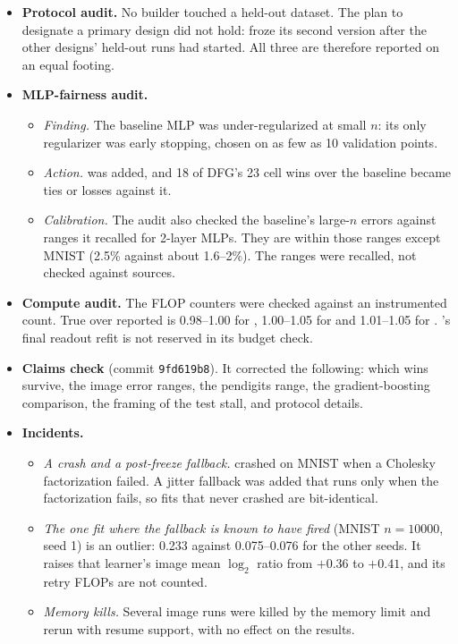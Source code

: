 \begin{itemize}
\item \textbf{Protocol audit.} No builder touched a held-out dataset. The plan to designate a primary design did not hold:  froze its second version after the other designs' held-out runs had started. All three are therefore reported on an equal footing.
\item \textbf{MLP-fairness audit.}
  \begin{itemize}
  \item \emph{Finding.} The baseline MLP was under-regularized at small $n$: its only regularizer was early stopping, chosen on as few as 10 validation points.
  \item \emph{Action.}  was added, and 18 of DFG's 23 cell wins over the baseline became ties or losses against it.
  \item \emph{Calibration.} The audit also checked the baseline's large-$n$ errors against ranges it recalled for 2-layer MLPs. They are within those ranges except MNIST (2.5\% against about 1.6--2\%). The ranges were recalled, not checked against sources.
  \end{itemize}
\item \textbf{Compute audit.} The FLOP counters were checked against an instrumented count. True over reported is 0.98--1.00 for , 1.00--1.05 for  and 1.01--1.05 for . 's final readout refit is not reserved in its budget check.
\item \textbf{Claims check} (commit \texttt{9fd619b8}). It corrected the following: which wins survive, the image error ranges, the pendigits range, the gradient-boosting comparison, the framing of the test stall, and protocol details.
\item \textbf{Incidents.}
  \begin{itemize}
  \item \emph{A crash and a post-freeze fallback.}  crashed on MNIST when a Cholesky factorization failed. A jitter fallback was added that runs only when the factorization fails, so fits that never crashed are bit-identical.
  \item \emph{The one fit where the fallback is known to have fired} (MNIST $n=10000$, seed 1) is an outlier: 0.233 against 0.075--0.076 for the other seeds. It raises that learner's image mean $\log_2$ ratio from $+0.36$ to $+0.41$, and its retry FLOPs are not counted.
  \item \emph{Memory kills.} Several image runs were killed by the memory limit and rerun with resume support, with no effect on the results.
  \end{itemize}
\end{itemize}

